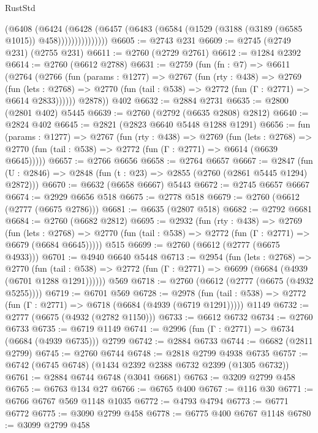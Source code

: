 \begin{lexlean}{RustStd}
\begin{coremodule}
                  (@6408
                    (@6424
                      (@6428
                        (@6457 (@6483 (@6584 (@1529 (@3188 (@3189 (@6585 @1015)) @458)))))))))))))))
@6605 := @2743 @231
@6609 := @2745 (@2749 @231) (@2755 @231)
@6611 := @2760 (@2729 @2761)
@6612 := @1284 @2392
@6614 := @2760 (@6612 @2788)
@6631 := @2759
    (fun (fn : @7) =>
    @6611
      (@2764
        (@2766
          (fun (params : @1277) =>
          @2767
            (fun (rty : @438) =>
            @2769
              (fun (lets : @2768) =>
              @2770 (fun (tail : @538) => @2772 (fun (Γ : @2771) => @6614 @2833))))))
        @2878))
    @402
@6632 := @2884 @2731
@6635 := @2800 (@2801 @402) @5445
@6639 := @2760 (@2792 (@6635 @2808) @2812)
@6640 := @2824 @402
@6645 := @2821 (@2823 @6640 @5448 @1288 @1291)
@6656 := fun (params : @1277) =>
  @2767
    (fun (rty : @438) =>
    @2769
      (fun (lets : @2768) =>
      @2770 (fun (tail : @538) => @2772 (fun (Γ : @2771) => @6614 (@6639 @6645)))))
@6657 := @2766 @6656
@6658 := @2764 @6657
@6667 := @2847 (fun (U : @2846) => @2848 (fun (t : @23) => @2855 (@2760 (@2861 @5445 @1294) @2872)))
@6670 := @6632 (@6658 @6667) @5443
@6672 := @2745 @6657 @6667
@6674 := @2929 @6656 @518
@6675 := @2778 @518
@6679 := @2760 (@6612 (@2777 (@6675 @2786)))
@6681 := @6635 (@2807 @518)
@6682 := @2792 @6681
@6684 := @2760 (@6682 @2812)
@6695 := @2932
    (fun (rty : @438) =>
    @2769
      (fun (lets : @2768) =>
      @2770 (fun (tail : @538) => @2772 (fun (Γ : @2771) => @6679 (@6684 @6645)))))
    @515
@6699 := @2760 (@6612 (@2777 (@6675 @4933)))
@6701 := @4940 @6640 @5448
@6713 := @2954
    (fun (lets : @2768) =>
    @2770
      (fun (tail : @538) => @2772 (fun (Γ : @2771) => @6699 (@6684 (@4939 (@6701 @1288 @1291))))))
    @569
@6718 := @2760 (@6612 (@2777 (@6675 (@4932 @5255))))
@6719 := @6701 @569
@6728 := @2978
    (fun (tail : @538) => @2772 (fun (Γ : @2771) => @6718 (@6684 (@4939 (@6719 @1291)))))
    @1149
@6732 := @2777 (@6675 (@4932 (@2782 @1150)))
@6733 := @6612 @6732
@6734 := @2760 @6733
@6735 := @6719 @1149
@6741 := @2996 (fun (Γ : @2771) => @6734 (@6684 (@4939 @6735))) @2799
@6742 := @2884 @6733
@6744 := @6682 (@2811 @2799)
@6745 := @2760 @6744
@6748 := @2818 @2799 @4938 @6735
@6757 := @6742 (@6745 @6748) (@1434 @2392 @2388 @6732 @2399 (@1305 @6732))
@6761 := @2884 @6744 @6748 (@3041 @6681)
@6763 := @3209 @2799 @458
@6765 := @6763 @134 @27
@6766 := @6765 @400
@6767 := @116 @30
@6771 := @6766 @6767 @569 @1148 @1035
@6772 := @4793 @4794
@6773 := @6771 @6772
@6775 := @3090 @2799 @458
@6778 := @6775 @400 @6767 @1148
@6780 := @3099 @2799 @458

\end{coremodule}
\end{lexlean}
